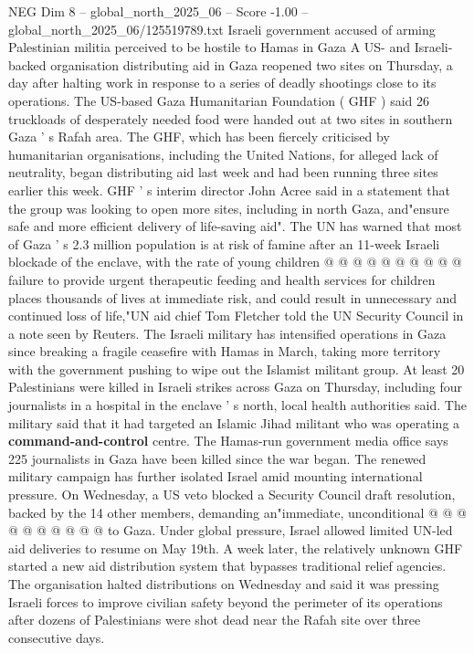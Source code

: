\begin{textsample}{NEG Dim 8 – global\_north\_2025\_06 – Score -1.00 – global\_north\_2025\_06/125519789.txt}  \label{ex:f8_neg_401}
Israeli government accused of arming Palestinian militia perceived to be hostile to Hamas in Gaza A US- and Israeli-backed organisation distributing aid in Gaza reopened two sites on Thursday, a day after halting work in response to a series of deadly shootings close to its operations.
The US-based Gaza Humanitarian Foundation ( GHF ) said 26 truckloads of desperately needed food were handed out at two sites in southern Gaza ' s Rafah area.
The GHF, which has been fiercely criticised by humanitarian organisations, including the United Nations, for alleged lack of neutrality, began distributing aid last week and had been running three sites earlier this week.
GHF ' s interim director John Acree said in a statement that the group was looking to open more sites, including in north Gaza, and"ensure safe and more efficient delivery of life-saving aid".
The UN has warned that most of Gaza ' s 2.3 million population is at risk of famine after an 11-week Israeli blockade of the enclave, with the rate of young children @ @ @ @ @ @ @ @ @ @ failure to provide urgent therapeutic feeding and health services for children places thousands of lives at immediate risk, and could result in unnecessary and continued loss of life,"UN aid chief Tom Fletcher told the UN Security Council in a note seen by Reuters.
The Israeli military has intensified operations in Gaza since breaking a fragile ceasefire with Hamas in March, taking more territory with the government pushing to wipe out the Islamist militant group.
At least 20 Palestinians were killed in Israeli strikes across Gaza on Thursday, including four journalists in a hospital in the enclave ' s north, local health authorities said.
The military said that it had targeted an Islamic Jihad militant who was operating a \textbf{command-and-control} centre.
The Hamas-run government media office says 225 journalists in Gaza have been killed since the war began.
The renewed military campaign has further isolated Israel amid mounting international pressure.
On Wednesday, a US veto blocked a Security Council draft resolution, backed by the 14 other members, demanding an"immediate, unconditional @ @ @ @ @ @ @ @ @ @ to Gaza.
Under global pressure, Israel allowed limited UN-led aid deliveries to resume on May 19th.
A week later, the relatively unknown GHF started a new aid distribution system that bypasses traditional relief agencies.
The organisation halted distributions on Wednesday and said it was pressing Israeli forces to improve civilian safety beyond the perimeter of its operations after dozens of Palestinians were shot dead near the Rafah site over three consecutive days.

\end{textsample}
